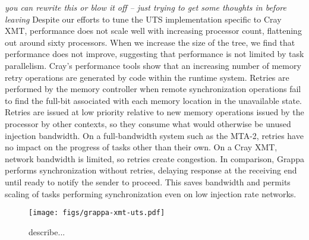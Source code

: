 {\em you can rewrite this or blow it off -- just trying to get some thoughts in before leaving}
Despite our efforts to tune the UTS implementation specific to Cray XMT, performance does not scale well with increasing processor count, flattening out around sixty processors.  When we increase the size of the tree, we find that performance does not improve, suggesting that performance is not limited by task parallelism.   Cray's performance tools show that an increasing number of memory retry operations are generated by code within the runtime system.  Retries are performed by the memory controller when remote synchronization operations fail to find the full-bit associated with each memory location in the unavailable state.  Retries are issued at low priority relative to new memory operations issued by the processor by other contexts, so they consume what would otherwise be unused injection bandwidth.  On a full-bandwidth system such as the MTA-2, retries have no impact on the progress of tasks other than their own.  On a Cray XMT, network bandwidth is limited, so retries create congestion.  In comparison, Grappa performs synchronization without retries, delaying response at the receiving end until ready to notify the sender to proceed.  This saves bandwidth and permits scaling of tasks performing synchronization even on low injection rate networks.





\begin{figure}[h]
    \begin{center}
        \texttt{[image: figs/grappa-xmt-uts.pdf]}
    \end{center}
    \caption{describe...}
    \label{fig:grappa-xmt-uts}
\end{figure}



